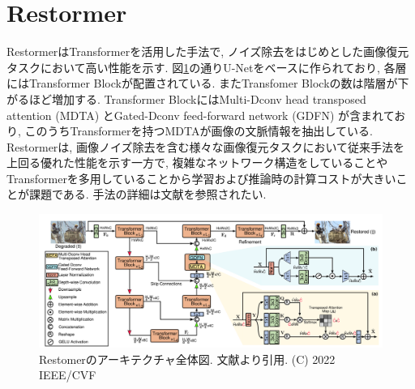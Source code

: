 \newpage
\section{Restormer}
Restormer\cite{Restormer}はTransformerを活用した手法で, ノイズ除去をはじめとした画像復元タスクにおいて高い性能を示す. 図\ref{fig:Restomer_overall}の通りU-Netをベースに作られており, 各層にはTransformer Blockが配置されている. またTransfomer Blockの数は階層が下がるほど増加する. Transformer BlockにはMulti-Dconv head transposed attention (MDTA) とGated-Dconv feed-forward network (GDFN) が含まれており, このうちTransformerを持つMDTAが画像の文脈情報を抽出している. Restormerは, 画像ノイズ除去を含む様々な画像復元タスクにおいて従来手法を上回る優れた性能を示す一方で, 複雑なネットワーク構造をしていることやTransformerを多用していることから学習および推論時の計算コストが大きいことが課題である. 手法の詳細は文献\cite{Restormer}を参照されたい. 

\begin{figure}[htbp]
\centering
\includegraphics[scale=0.29]{figures/Architecture_of_Restormer.png}
\caption{Restomerのアーキテクチャ全体図. 文献\cite{Restormer}より引用. (C) 2022 IEEE/CVF　\label{fig:Restomer_overall}}
\end{figure}

 